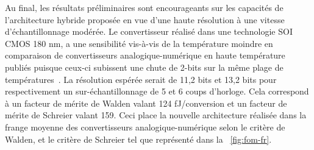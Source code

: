 \begin{mdframed}[linecolor=Prune,linewidth=1]
Au final, les résultats préliminaires sont encourageants sur les capacités de l'architecture hybride proposée en vue d'une haute résolution à une vitesse d'échantillonnage modérée. Le convertisseur réalisé dans une technologie SOI CMOS 180 nm, a une sensibilité vis-à-vis de la température moindre en comparaison de convertisseurs analogique-numérique en haute température publiés puisque ceux-ci subissent une chute de 2-bits sur la même plage de températures~\cite{Ericson2004}. La résolution espérée serait de 11,2 bits et 13,2 bits pour respectivement un sur-échantillonnage de 5 et 6 coups d'horloge. Cela correspond à un facteur de mérite de Walden valant 124 fJ/conversion et un facteur de mérite de Schreier valant 159. Ceci place la nouvelle architecture réalisée dans la frange moyenne des convertisseurs analogique-numérique selon le critère de Walden, et le critère de Schreier tel que représenté dans la \figurename~\ref{fig:fom-fr}.


\end{mdframed}
